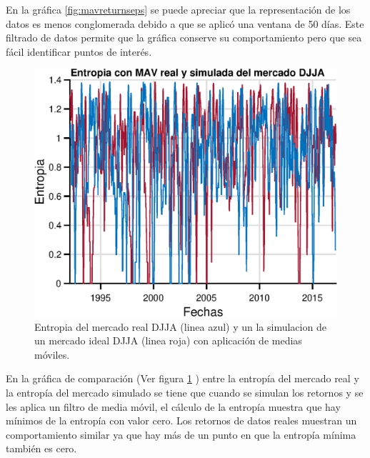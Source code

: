 En la gráfica \ref{fig:mavreturnseps} se puede apreciar que la representación de los datos es menos conglomerada debido a que se aplicó una ventana de 50 días. Este filtrado de datos permite que la gráfica conserve su comportamiento pero que sea fácil identificar puntos de interés.

\begin{figure}
	\centering
	\includegraphics[width=0.7\linewidth]{figures/MAVentropy}
	\caption{Entropia del mercado real DJJA (linea azul) y un la simulacion de un mercado ideal DJJA (linea roja) con aplicación de medias móviles.}
	\label{fig:maventropy}
\end{figure}

En la gráfica de comparación (Ver figura \ref{fig:maventropy} ) entre la entropía del mercado real y la entropía del mercado simulado se tiene que cuando se simulan los retornos y se les aplica un filtro de media móvil, el cálculo de la entropía muestra que hay mínimos de la entropía con valor cero. Los retornos de datos reales muestran un comportamiento similar ya que hay más de un punto en que la entropía mínima también es cero.